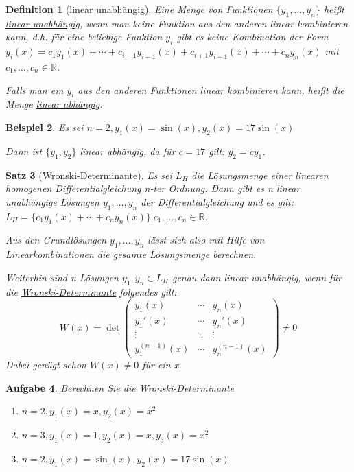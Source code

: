 \documentclass[12pt,a4paper]{scrreprt}
\newtheorem{defi}{Definition}[section]
\newtheorem{beispiel}[defi]{Beispiel}
\newtheorem{satz}[defi]{Satz}
\newtheorem{aufg}[defi]{Aufgabe}
\begin{document}
	\begin{defi}[linear unabhängig]
		Eine Menge von Funktionen $\{y_1,\dots,y_n\}$ heißt \underline{linear unabhängig}, wenn man keine Funktion aus den anderen linear kombinieren kann, d.h. für eine beliebige Funktion $y_i$ gibt es keine Kombination der Form $y_i(x)=c_1y_1(x)+\cdots+c_{i-1}y_{i-1}(x)+c_{i+1}y_{i+1}(x)+\cdots+c_ny_n(x)$ mit $c_1,\dots,c_n \in \mathbb{R}$.

		Falls man ein $y_i$ aus den anderen Funktionen linear kombinieren kann, heißt die Menge \underline{linear abhängig}.
	\end{defi}

	\begin{beispiel}
		Es sei $n=2,y_1(x)=\sin(x),y_2(x)=17\sin(x)$

		Dann ist $\{y_1,y_2\}$ linear abhängig, da für $c=17$ gilt: $y_2=cy_1$.
	\end{beispiel}

	\begin{satz}[Wronski-Determinante]
		Es sei $L_H$ die Lösungsmenge einer linearen homogenen Differentialgleichung n-ter Ordnung. Dann gibt es n linear unabhängige Lösungen $y_1,\dots,y_n$ der Differentialgleichung und es gilt: $L_H=\{c_1y_1(x)+\cdots+c_ny_n(x)\}|c_1,\dots,c_n\in\mathbb{R}$.

		Aus den Grundlösungen $y_1,\dots,y_n$ lässt sich also mit Hilfe von Linearkombinationen die gesamte Lösungsmenge berechnen.

		Weiterhin sind n Lösungen $y_1,y_n \in L_H$ genau dann linear unabhängig, wenn für die \underline{Wronski-Determinante} folgendes gilt:
		\[W(x)=\det\begin{pmatrix}
			y_1(x) & \cdots & y_n(x) \\
			y_1'(x) & \cdots & y_n'(x) \\
			\vdots & \ddots & \vdots \\
			y_1^{(n-1)}(x) & \cdots & y_n^{(n-1)}(x)
		\end{pmatrix} \ne 0 \]
		Dabei genügt schon $W(x) \ne 0$ für ein x.
	\end{satz}

	\begin{aufg}
		Berechnen Sie die Wronski-Determinante
		\begin{enumerate}[label=\emph{(\roman*)}]
			\item $n=2,y_1(x)=x,y_2(x)=x^2$
			\item $n=3,y_1(x)=1,y_2(x)=x,y_3(x)=x^2$
			\item $n=2,y_1(x)=\sin(x),y_2(x)=17\sin(x)$
		\end{enumerate}
	\end{aufg}
\end{document}
